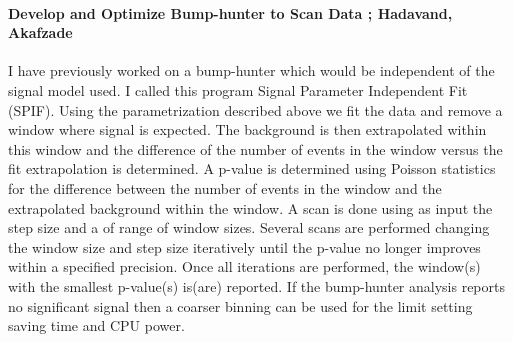\paragraph{Develop and Optimize Bump-hunter to Scan Data ;  Hadavand, Akafzade} %
I have previously worked on a bump-hunter which would be independent of the signal model used.  I called this program Signal Parameter Independent Fit (SPIF).  Using the parametrization described above we fit the data and remove a window where signal is expected.
The background is then extrapolated within this window and the difference of the number of events in the window versus the fit extrapolation is determined.  A p-value is determined using Poisson statistics for the difference between the number of events in the window and the extrapolated background within the window.
A scan is done using as input the step size and a of range of window sizes.  Several scans are performed changing the window size and step size iteratively until the p-value no longer improves within a specified precision.  
Once all iterations are performed, the window(s) with the smallest p-value(s) is(are) reported.  
If the bump-hunter analysis reports no significant signal then a coarser binning can be used for the limit setting saving time and CPU power.






